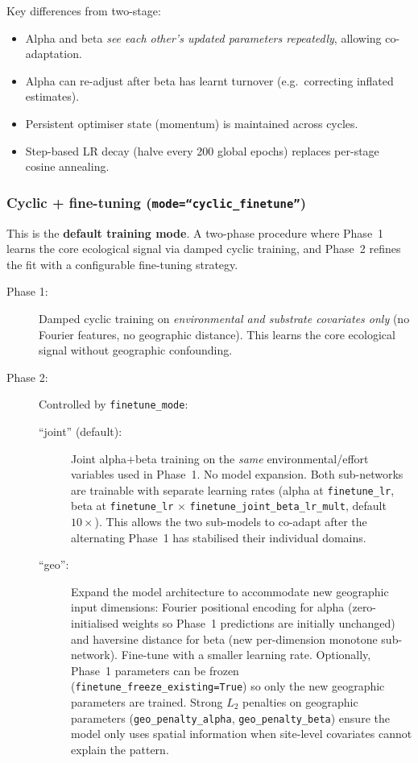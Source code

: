\documentclass{article}
\begin{document}
Key differences from two-stage:
\begin{itemize}
    \item Alpha and beta \textit{see each other's updated parameters repeatedly}, allowing co-adaptation.
    \item Alpha can re-adjust after beta has learnt turnover (e.g.\ correcting inflated estimates).
    \item Persistent optimiser state (momentum) is maintained across cycles.
    \item Step-based LR decay (halve every 200 global epochs) replaces per-stage cosine annealing.
\end{itemize}

\subsubsection{Cyclic + fine-tuning (\texttt{mode=``cyclic\_finetune''})}
\label{sec:cyclic-finetune}

This is the \textbf{default training mode}. A two-phase procedure where Phase~1 learns the core ecological signal via damped cyclic training, and Phase~2 refines the fit with a configurable fine-tuning strategy.

\begin{description}
    \item[Phase 1:] Damped cyclic training on \textit{environmental and substrate covariates only} (no Fourier features, no geographic distance). This learns the core ecological signal without geographic confounding.
    
    \item[Phase 2:] Controlled by \texttt{finetune\_mode}:
    \begin{description}
        \item[``joint'' (default):] Joint alpha+beta training on the \textit{same} environmental/effort variables used in Phase~1. No model expansion. Both sub-networks are trainable with separate learning rates (alpha at \texttt{finetune\_lr}, beta at \texttt{finetune\_lr} $\times$ \texttt{finetune\_joint\_beta\_lr\_mult}, default $10\times$). This allows the two sub-models to co-adapt after the alternating Phase~1 has stabilised their individual domains.
        \item[``geo'':] Expand the model architecture to accommodate new geographic input dimensions: Fourier positional encoding for alpha (zero-initialised weights so Phase~1 predictions are initially unchanged) and haversine distance for beta (new per-dimension monotone sub-network). Fine-tune with a smaller learning rate. Optionally, Phase~1 parameters can be frozen (\texttt{finetune\_freeze\_existing=True}) so only the new geographic parameters are trained. Strong $L_2$ penalties on geographic parameters (\texttt{geo\_penalty\_alpha}, \texttt{geo\_penalty\_beta}) ensure the model only uses spatial information when site-level covariates cannot explain the pattern.
    \end{description}
\end{description}
\end{document}
